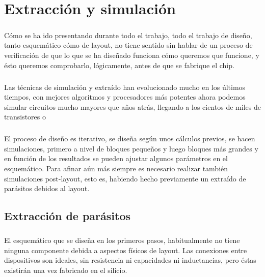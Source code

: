 \chapter{Extracción y simulación}

\paragraph{}
Cómo se ha ido presentando durante todo el trabajo, todo el trabajo de diseño,
tanto esquemático cómo de layout, no tiene sentido sin hablar de un proceso de
verificación de que lo que se ha diseñado funciona cómo queremos que funcione,
y ésto queremos comprobarlo, lógicamente, antes de que se fabrique el chip.

\paragraph{}
Las técnicas de simulación y extraído han evolucionado mucho en los últimos tiempos,
con mejores algoritmos y procesadores más potentes ahora podemos simular circuitos
mucho mayores que años atrás, llegando a los cientos de miles de transistores o

\paragraph{}
El proceso de diseño es iterativo, se diseña según unos cálculos previos, se hacen
simulaciones, primero a nivel de bloques pequeños y luego bloques más grandes y
en función de los resultados se pueden ajustar algunos parámetros en el esquemático.
Para afinar aún más siempre es necesario realizar también simulaciones post-layout,
esto es, habiendo hecho previamente un extraído de parásitos debidos al layout.

\section{Extracción de parásitos}\label{cap:extraccion}

\paragraph{}
El esquemático que se diseña en los primeros pasos, habitualmente no tiene ninguna
componente debida a aspectos físicos de layout. Las conexiones entre dispositivos
son ideales, sin resistencia ni capacidades ni inductancias, pero éstas existirán
una vez fabricado en el silicio.

